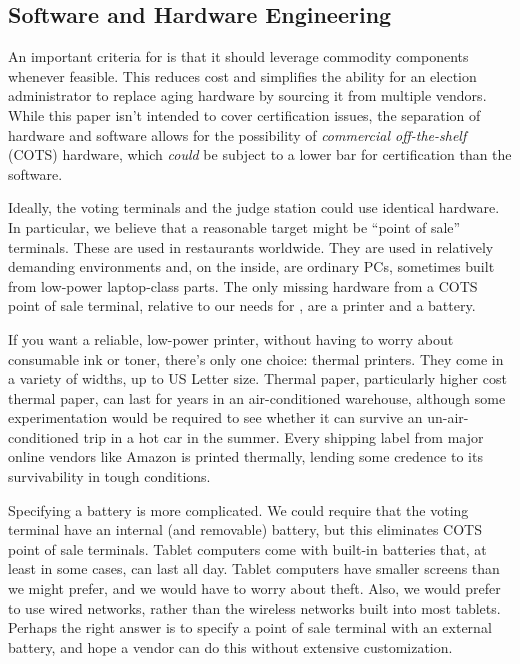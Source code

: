 \subsection{Software and Hardware Engineering}

An important criteria for \projname is that it should leverage commodity components whenever feasible. This reduces cost and simplifies the ability for an election administrator to replace aging hardware by sourcing it from multiple vendors. While this paper isn't intended to cover certification issues, the separation of hardware and software allows for the possibility of {\em commercial off-the-shelf} (COTS) hardware, which {\em could} be subject to a lower bar for certification than the software.

Ideally, the voting terminals and the judge station could use identical hardware. In particular, we believe that a reasonable target might be ``point of sale'' terminals. These are used in restaurants worldwide. They are used in relatively demanding environments and, on the inside, are ordinary PCs, sometimes built from low-power laptop-class parts. The only missing hardware from a COTS point of sale terminal, relative to our needs for \projname, are a printer and a battery.

If you want a reliable, low-power printer, without having to worry about consumable ink or toner, there's only one choice: thermal printers. They come in a variety of widths, up to US Letter size. Thermal paper, particularly higher cost thermal paper, can last for years in an air-conditioned warehouse, although some experimentation would be required to see whether it can survive an un-air-conditioned trip in a hot car in the summer. Every shipping label from major online vendors like Amazon is printed thermally, lending some credence to its survivability in tough conditions.


Specifying a battery is more complicated. We could require that the voting terminal have an internal (and removable) battery, but this eliminates COTS point of sale terminals. Tablet computers come with built-in batteries that, at least in some cases, can last all day. Tablet computers have smaller screens than we might prefer, and we would have to worry about theft. Also, we would prefer to use wired networks, rather than the wireless networks built into most tablets. Perhaps the right answer is to specify a point of sale terminal with an external battery, and hope a vendor can do this without extensive customization.

